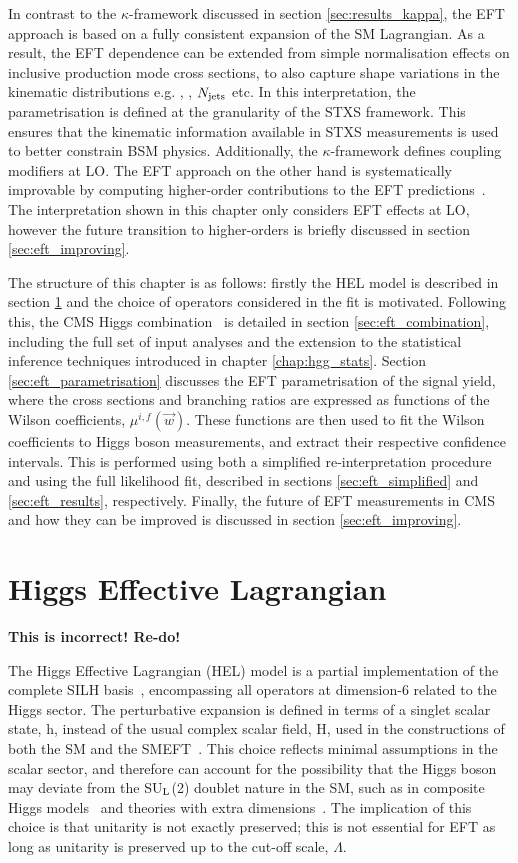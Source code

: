 In contrast to the $\kappa$-framework discussed in section \ref{sec:results_kappa}, the EFT approach is based on a fully consistent expansion of the SM Lagrangian. As a result, the EFT dependence can be extended from simple normalisation effects on inclusive production mode cross sections, to also capture shape variations in the kinematic distributions e.g. \ptH, \mjj, $N_{\rm{jets}}$ etc. In this interpretation, the parametrisation is defined at the granularity of the STXS framework. This ensures that the kinematic information available in STXS measurements is used to better constrain BSM physics. Additionally, the $\kappa$-framework defines coupling modifiers at LO. The EFT approach on the other hand is systematically improvable by computing higher-order contributions to the EFT predictions~\cite{Degrande:2020evl}. The interpretation shown in this chapter only considers EFT effects at LO, however the future transition to higher-orders is briefly discussed in section \ref{sec:eft_improving}.

The structure of this chapter is as follows: firstly the HEL model is described in section \ref{sec:eft_hel} and the choice of operators considered in the fit is motivated. Following this, the CMS Higgs combination~\cite{CMS-PAS-HIG-19-005} is detailed in section \ref{sec:eft_combination}, including the full set of input analyses and the extension to the statistical inference techniques introduced in chapter \ref{chap:hgg_stats}. Section \ref{sec:eft_parametrisation} discusses the EFT parametrisation of the signal yield, where the cross sections and branching ratios are expressed as functions of the Wilson coefficients, $\mu^{i,f}(\vec{w})$. These functions are then used to fit the Wilson coefficients to Higgs boson measurements, and extract their respective confidence intervals. This is performed using both a simplified re-interpretation procedure and using the full likelihood fit, described in sections \ref{sec:eft_simplified} and \ref{sec:eft_results}, respectively. Finally, the future of EFT measurements in CMS and how they can be improved is discussed in section \ref{sec:eft_improving}.

\section{Higgs Effective Lagrangian}\label{sec:eft_hel}

\textbf{This is incorrect! Re-do!}

The Higgs Effective Lagrangian (HEL) model is a partial implementation of the complete SILH basis~\cite{}, encompassing all operators at dimension-6 related to the Higgs sector. The perturbative expansion is defined in terms of a singlet scalar state, h, instead of the usual complex scalar field, H, used in the constructions of both the SM and the SMEFT~\cite{}. This choice reflects minimal assumptions in the scalar sector, and therefore can account for the possibility that the Higgs boson may deviate from the SU$_{\rm{L}}$(2) doublet nature in the SM, such as in composite Higgs models~\cite{} and theories with extra dimensions~\cite{}. The implication of this choice is that unitarity is not exactly preserved; this is not essential for EFT as long as unitarity is preserved up to the cut-off scale, $\Lambda$.

